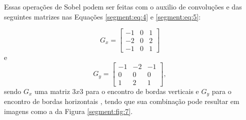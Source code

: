 Essas operações de Sobel podem ser feitas com o auxilio de convoluções e das seguintes matrizes nas Equações \ref{segment:eq:4} e \ref{segment:eq:5}:

\begin{equation}
\label{segment:eq:4}
    G_x = \begin{bmatrix}
    -1 & 0 & 1 \\ 
    -2 & 0 & 2 \\ 
    -1 & 0 & 1
    \end{bmatrix}
\end{equation}
e
\begin{equation}
\label{segment:eq:5}
    G_y = \begin{bmatrix}
    -1 & -2 & -1 \\ 
     0 & 0 & 0 \\ 
     1 & 2 & 1
    \end{bmatrix},
\end{equation}
sendo $G_x$ uma matriz $3x3$ para o encontro de bordas verticais e $G_y$ para o encontro de bordas horizontais \citep{pedrini2008analise}, tendo que sua combinação pode resultar em imagens como a da Figura \ref{segment:fig:7}.

